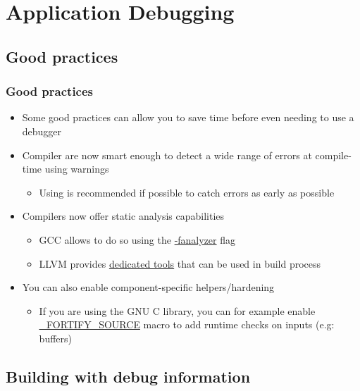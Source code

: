 \section{Application Debugging}

\subsection{Good practices}

\begin{frame}
  \frametitle{Good practices}
  \begin{itemize}
    \item Some good practices can allow you to save time before even needing to
          use a debugger
    \item Compiler are now smart enough to detect a wide range of errors at
          compile-time using warnings
    \begin{itemize}
      \item Using  is recommended if possible to catch
            errors as early as possible
    \end{itemize}
    \item Compilers now offer static analysis capabilities
    \begin{itemize}
      \item GCC allows to do so using the \href{https://gcc.gnu.org/onlinedocs/gcc-11.1.0/gcc/Static-Analyzer-Options.html}{-fanalyzer} flag
      \item LLVM provides \href{https://clang-analyzer.llvm.org/command-line.html}{dedicated tools} that can be used in build process
    \end{itemize}
    \item You can also enable component-specific helpers/hardening
    \begin{itemize}
      \item If you are using the GNU C library, you can for example enable
            \href{https://www.gnu.org/software/libc/manual/html_node/Source-Fortification.html}{\_FORTIFY\_SOURCE}
            macro to add runtime checks on inputs (e.g: buffers)
    \end{itemize}
  \end{itemize}
\end{frame}

\subsection{Building with debug information}

